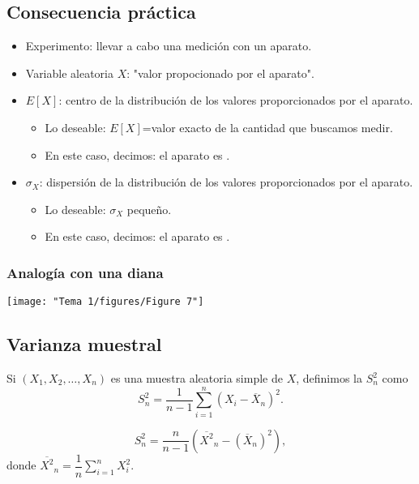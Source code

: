 \subsection{Consecuencia práctica}
\begin{tcolorbox}[colback=blue!5!white, colframe=blue!75!black, title=\textbf{Aparato de medición}]
\begin{itemize}[label=\textbullet]
  \item Experimento: llevar a cabo una medición con un aparato.
  \item Variable aleatoria $X$: "valor propocionado por el aparato".
  \item  $E[X]$: centro de la distribución de los valores proporcionados por el aparato.
    \begin{itemize}[label=\textrightarrow]
      \item Lo deseable: $E[X]$=valor exacto de la cantidad que buscamos medir.
      \item En este caso, decimos: el aparato es  . 
    \end{itemize}
  \item $\sigma_X$: dispersión de la distribución de los valores proporcionados por el aparato.
    \begin{itemize}[label=\textrightarrow]
      \item Lo deseable: $\sigma_X$ pequeño.
      \item En este caso, decimos: el aparato es . 
    \end{itemize}
\end{itemize}
\end{tcolorbox}
\subsubsection{Analogía con una diana}
\begin{center}
  \texttt{[image: "Tema 1/figures/Figure 7"]}
\end{center}
\subsection{Varianza muestral}
Si $(X_1,X_2,\dots,X_n)$ es una muestra aleatoria simple de $X$, definimos la   $S_n^2$ como \[
  S_n^2=\dfrac{1}{n-1}\sum_{i=1}^{n} \left( X_i-\overline{X}_n \right)^2. 
\] 
\begin{tcolorbox}[colback=blue!5!white, colframe=blue!75!black, title=\textbf{Fórmula alternativa para $S_n^2$:}]
\[
  S_n^2=\dfrac{n}{n-1}\left( \overline{X^2}_n-(\overline{X}_n)^2 \right) ,
\] donde $\overline{X^2}_n=\dfrac{1}{n}\sum_{i=1}^{n}X_i^2$.
\end{tcolorbox}
